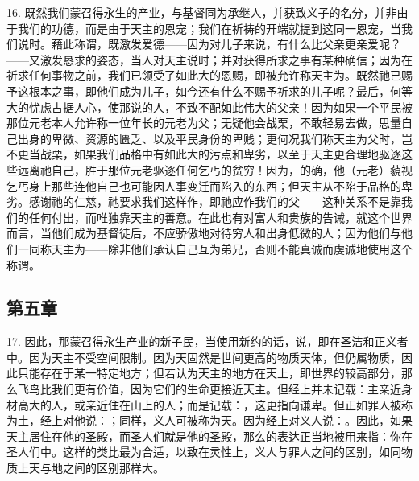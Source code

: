 16. 既然我们蒙召得永生的产业，与基督同为承继人，并获致义子的名分，并非由于我们的功德，而是由于天主的恩宠；我们在祈祷的开端就提到这同一恩宠，当我们说时。藉此称谓，既激发爱德——因为对儿子来说，有什么比父亲更亲爱呢？——又激发恳求的姿态，当人对天主说时；并对获得所求之事有某种确信；因为在祈求任何事物之前，我们已领受了如此大的恩赐，即被允许称天主为。既然祂已赐予这根本之事，即他们成为儿子，如今还有什么不赐予祈求的儿子呢？最后，何等大的忧虑占据人心，使那说的人，不致不配如此伟大的父亲！因为如果一个平民被那位元老本人允许称一位年长的元老为父；无疑他会战栗，不敢轻易去做，思量自己出身的卑微、资源的匮乏、以及平民身份的卑贱；更何况我们称天主为父时，岂不更当战栗，如果我们品格中有如此大的污点和卑劣，以至于天主更合理地驱逐这些远离祂自己，胜于那位元老驱逐任何乞丐的贫穷！因为，的确，他（元老）藐视乞丐身上那些连他自己也可能因人事变迁而陷入的东西；但天主从不陷于品格的卑劣。感谢祂的仁慈，祂要求我们这样作，即祂应作我们的父——这种关系不是靠我们的任何付出，而唯独靠天主的善意。在此也有对富人和贵族的告诫，就这个世界而言，当他们成为基督徒后，不应骄傲地对待穷人和出身低微的人；因为他们与他们一同称天主为——除非他们承认自己互为弟兄，否则不能真诚而虔诚地使用这个称谓。\par


\subsection{第五章}

17. 因此，那蒙召得永生产业的新子民，当使用新约的话，说，即在圣洁和正义者中。因为天主不受空间限制。因为天固然是世间更高的物质天体，但仍属物质，因此只能存在于某一特定地方；但若认为天主的地方在天上，即世界的较高部分，那么飞鸟比我们更有价值，因为它们的生命更接近天主。但经上并未记载：主亲近身材高大的人，或亲近住在山上的人；而是记载：，这更指向谦卑。但正如罪人被称为土，经上对他说：；同样，义人可被称为天。因为经上对义人说：。因此，如果天主居住在他的圣殿，而圣人们就是他的圣殿，那么的表达正当地被用来指：你在圣人们中。这样的类比最为合适，以致在灵性上，义人与罪人之间的区别，如同物质上天与地之间的区别那样大。\par

